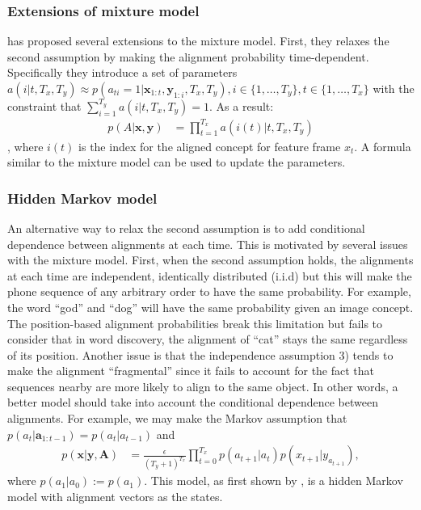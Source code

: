 \documentclass[journal]{IEEEtran}
\begin{document}
\subsubsection{Extensions of mixture model}
\cite{Brown92} has proposed several extensions to the mixture model. First, they relaxes the second assumption by making the alignment probability time-dependent. Specifically they introduce a set of parameters $a(i|t, T_x, T_y) \approx p(a_{ti} = 1|\mathbf x_{1:t}, \mathbf y_{1:i}, T_x, T_y), i\in \{1,\ldots,T_y\}, t\in \{1,\ldots,T_x\}$ with the constraint that $\sum_{i=1}^{T_y} a(i|t, T_x, T_y) = 1$. As a result:
\begin{align}\label{eq:align_prob_ibm2}
    p(A|\mathbf x, \mathbf y)& = \prod_{t=1}^{T_x} a(i(t)|t, T_x, T_y)
\end{align}
, where $i(t)$ is the index for the aligned concept for feature frame $x_t$. A formula similar to the mixture model can be used to update the parameters. 


\subsubsection{Hidden Markov model}
An alternative way to relax the second assumption is to add conditional dependence between alignments at each time. This is motivated by several issues with the mixture model. First, when the second assumption holds, the alignments at each time are independent, identically distributed (i.i.d) but this will make the phone sequence of any arbitrary order to have the same probability. For example, the word ``god'' and ``dog'' will have the same probability given an image concept. The position-based alignment probabilities break this limitation but fails to consider that in word discovery, the alignment of ``cat'' stays the same regardless of its position. Another issue is that the independence assumption 3) tends to make the alignment ``fragmental'' since it fails to account for the fact that sequences nearby are more likely to align to the same object. In other words, a better model should take into account the conditional dependence between alignments. For example, we may make the Markov assumption that $p(a_t|\mathbf a_{1:t-1}) = p(a_t|a_{t-1})$ and 
\begin{align}\label{eq:align_prob_hmm}
    p(\mathbf x|\mathbf y, \mathbf A) &= \frac{\epsilon}{(T_y+1)^{T_x}}\prod_{t=0}^{T_x} p(a_{t+1}|a_t) p(x_{t+1}|y_{a_{t+1}}),
\end{align}
where $p(a_1|a_0) := p(a_1)$. This model, as first shown by \cite{Vogel1996}, is a hidden Markov model with alignment vectors as the states. 
\end{document}
